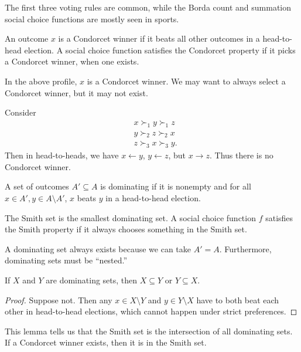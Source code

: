 The first three voting rules are common, while the Borda count and summation social choice functions are mostly seen in sports.

\begin{definition}
	An outcome $x$ is a Condorcet winner if it beats all other outcomes in a head-to-head election. A social choice function satisfies the Condorcet property if it picks a Condorcet winner, when one exists.
\end{definition}

In the above profile, $x$ is a Condorcet winner. We may want to always select a Condorcet winner, but it may not exist.
\begin{example}
	Consider
	\begin{align*}
			&x \succ_1 y \succ_1 z \\ 
		&y \succ_2 z \succ_2 x \\
		&z \succ_3 x \succ_3 y
	.\end{align*}
	Then in head-to-heads, we have $x \leftarrow y$, $y \leftarrow z$, but $x \rightarrow z$. Thus there is no Condorcet winner.
\end{example}

\begin{definition}
	A set of outcomes $A' \subseteq A$ is dominating if it is nonempty and for all $x \in A', y \in A \setminus A'$, $x$ beats $y$ in a head-to-head election.

	The Smith set is the smallest dominating set. A social choice function $f$ satisfies the Smith property if it always chooses something in the Smith set.
\end{definition}

A dominating set always exists because we can take $A' = A$. Furthermore, dominating sets must be ``nested.''
\begin{lemma}
	If $X$ and $Y$ are dominating sets, then $X \subseteq Y$ or $Y \subseteq X$.
\end{lemma}
\begin{proof}
	Suppose not. Then any $x \in X \setminus Y$ and $y \in Y \setminus X$ have to both beat each other in head-to-head elections, which cannot happen under strict preferences.
\end{proof}

This lemma tells us that the Smith set is the intersection of all dominating sets. If a Condorcet winner exists, then it is in the Smith set. 

